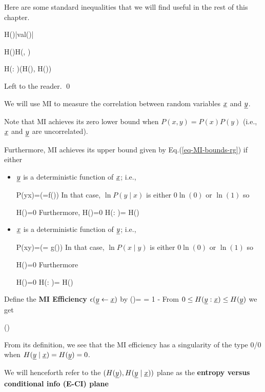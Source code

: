 Here are some standard inequalities
that we will find useful in the rest of this chapter.
\begin{claim}
\leq H(\rvx)\leq \ln|val(\rvx)|
\eeq

\leq H(\rvy\mid \rvx)\leq H(\rvx, \rvy)
\eeq

\leq H(\rvx: \rvy)\leq \min(H(\rvx), H(\rvy))
\label{eq-MI-bounds-rg}
\eeq
\end{claim}
\proof
Left to the reader.
\qed

We will use MI to
measure the correlation
between random variables $\rvx$ and $\rvy$.

Note that MI achieves its zero
lower bound
when $P(x,y)=P(x)P(y)$
(i.e., $\rvx$ and $\rvy$ are uncorrelated).

Furthermore, MI achieves its 
upper bound given by Eq.(\ref{eq-MI-bounds-rg})
if either 

\begin{itemize}
\item
$\rvy$
is a deterministic
function of $\rvx$; i.e., 

\beq P(y\mid x)=\indi(\rvy=f(\rvx))\eeq
In that case,
$\ln P(y\mid x)$ is either $0\ln(0)$
or $\ln(1)$ so 

\beq
H(\rvy\mid\rvx)=0
\eeq
Furthermore,
\beq
H(\rvy\mid\rvx)=0\implies 
 H(\rvx: \rvy)= H(\rvy)
\eeq

\item $\rvx$ 
is a deterministic function of $\rvy$; i.e.,  
 
\beq
P(x\mid y)=\indi(\rvx = g(\rvy))
\eeq
In that case,
$\ln P(x\mid y)$ is either $0\ln(0)$
or $\ln(1)$ so

\beq
H(\rvx\mid\rvy)=0
\eeq
Furthermore

\beq
H(\rvx\mid\rvy)=0\implies 
 H(\rvx: \rvy)= H(\rvx)
\eeq
\end{itemize}




Define the {\bf MI Efficiency} $\eps(\rvy\larrow \rvx)$ by
\beq
\eps(\rvy\larrow \rvx)=
= 1 - 
\eeq
From $0\leq H(\rvy:\rvx)\leq H(\rvy)$ we get

\leq \eps(\rvy\larrow \rvx)
\eeq

From its definition, we see that the MI efficiency has a 
singularity of the type 0/0
when $H(\rvy\mid \rvx)= H(\rvy)=0$.

We will henceforth
refer to the
$(H(\rvy), H(\rvy\mid\rvx))$ plane
as the {\bf entropy versus conditional info (E-CI) plane}


